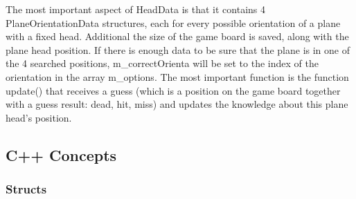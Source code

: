 The most important aspect of HeadData is that it contains 4 PlaneOrientationData structures, each for every possible orientation of a plane with a fixed head. Additional the size of the game board is saved, along with the plane head position. If there is enough data to be sure that the plane is in one of the 4 searched positions, m\_correctOrienta will be set to the index of the orientation in the array m\_options. The most important function is the function update() that receives a guess (which is a position on the game board together with a guess result: dead, hit, miss) and updates the knowledge about this plane head's position.

\subsection{C++ Concepts}

\subsubsection{Structs}
